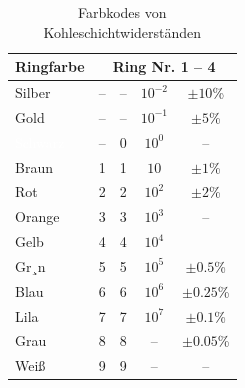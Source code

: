 \begin{table}[h]

\begin{center}
\begin{tabular}{|p{}|c|c|c|c|}\hline 
\rowcolor{lightgray} Ringfarbe      & \multicolumn{4}{c|}{Ring Nr. 1 -- 4 } \\\hline 
Silber  \cellcolor{silver}    & -- & -- & $10^{-2}$  &  $\pm10$\%\\\hline
Gold    \cellcolor{gold}    & -- & -- &  $10^{-1}$ &  $\pm5$\%\\\hline
\textcolor{white}{Schwarz}  \cellcolor{black}& -- & 0 & $10^{0}$   &  --  \\\hline
Braun   \cellcolor{brown}   & 1 & 1 & $10$            &  $\pm1$\%\\\hline
Rot    \cellcolor{red}      & 2 & 2 & $10^{2}$    &  $\pm2$\%\\\hline
Orange   \cellcolor{orange}& 3 & 3 & $10^{3}$    &  --\\\hline
Gelb      \cellcolor{yellow} & 4  & 4 & $10^{4}$ &  \\\hline
Gr¸n      \cellcolor{green} & 5  & 5 & $10^{5}$ &  $\pm0.5$\%\\\hline
Blau       \cellcolor{blue} & 6  & 6 & $10^{6}$ &  $\pm0.25$\%\\\hline
Lila         \cellcolor{violet} & 7  & 7 & $10^{7}$ &  $\pm0.1$\%\\\hline
Grau        \cellcolor{gray}  & 8  & 8 & --              &  $\pm0.05$\%\\\hline
Weiß       & 9  & 9 & --              &  -- \\\hline
\end{tabular}
\end{center}
\caption{Farbkodes von Kohleschichtwiderständen}
\label{tab:farbcodes}
\end{table}%

